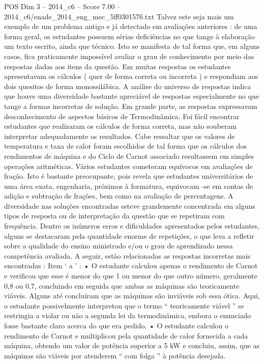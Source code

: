 \begin{textsample}{POS Dim 3 – 2014\_c6 – Score 7.00 – 2014\_c6/enade\_2014\_eng\_mec\_5ff0301576.txt}
Talvez este seja mais um exemplo de um problema antigo e já detectado em avaliações anteriores : de uma forma geral, os estudantes possuem sérias deficiências no que tange à elaboração um texto escrito, ainda que técnico.
Isto se manifesta de tal forma que, em alguns casos, fica praticamente impossível avaliar o grau de conhecimento por meio das respostas dadas aos itens da questão.
Em muitas respostas os estudantes apresentavam os cálculos ( quer de forma correta ou incorreta ) e respondiam aos dois quesitos de forma monossilábica.
A análise do universo de respostas indica que houve uma diversidade bastante apreciável de respostas especialmente no que tange a formas incorretas de solução.
Em grande parte, as respostas expressavam desconhecimento de aspectos básicos de Termodinâmica.
Foi fácil encontrar estudantes que realizaram os cálculos de forma correta, mas não souberam interpretar adequadamente os resultados.
Cabe ressaltar que os valores de temperatura e taxa de calor foram escolhidos de tal forma que os cálculos dos rendimentos de máquina e do Ciclo de Carnot associado resultassem em simples operações aritméticas.
Vários estudantes cometeram equívocos em avaliações de fração.
Isto é bastante preocupante, pois revela que estudantes universitários de uma área exata, engenharia, próximos à formatura, equivocam -se em contas de adição e subtração de frações, bem como na avaliação de percentagens.
A diversidade nas soluções encontradas esteve grandemente concentrada em alguns tipos de resposta ou de interpretação da questão que se repetiram com frequência.
Dentre os inúmeros erros e dificuldades apresentados pelos estudantes, alguns se destacaram pela quantidade enorme de repetições, o que leva a refletir sobre a qualidade do ensino ministrado e/ou o grau de aprendizado nessa competência avaliada.
A seguir, estão relacionadas as respostas incorretas mais encontradas : Item ‘ a ’ : • O estudante calculou apenas o rendimento de Carnot e verificou que esse é menor do que 1 ou menor do que outro número, geralmente 0,8 ou 0,7, concluindo em seguida que ambas as máquinas são teoricamente viáveis.
Alguns até concluíram que as máquinas são inviáveis sob essa ótica.
Aqui, o estudante possivelmente interpretou que o termo “ teoricamente viável ” se restringia a violar ou não a segunda lei da termodinâmica, embora o enunciado fosse bastante claro acerca do que era pedido. • O estudante calculou o rendimento de Carnot e multiplicou pela quantidade de calor fornecida a cada máquina, obtendo um valor de potência superior a 5 kW e concluiu, assim, que as máquinas são viáveis por atenderem “ com folga ” à potência desejada.

\end{textsample}
